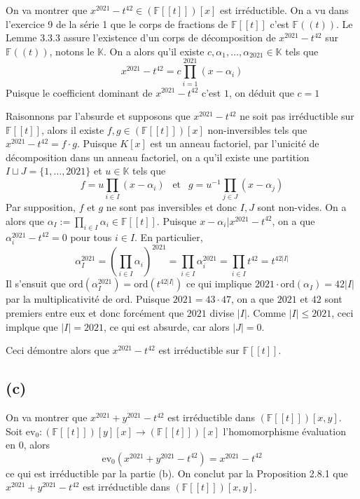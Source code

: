 \documentclass{article}
\newcommand{\F}{\mathbb{F}}
\newcommand{\K}{\mathbb{K}}
\newcommand{\sef}{\F[[t]]}
\newcommand{\sel}{\F((t))}
\newcommand{\ord}{\mathrm{ord}}
\newcommand{\ev}{\mathrm{ev}}
\begin{document}
On va montrer que $x^{2021} - t^{42} \in (\sef)[x]$ est
irréductible. On a vu dans l'exercice 9 de la série 1 que le
corps de fractions de $\sef$ c'est $\sel$.
Le Lemme $3.3.3$ assure l'existence d'un corps de décomposition de
$x^{2021} - t^{42}$ sur $\sel$, notons le $\K$. On a alors qu'il
existe $c, \alpha_1, \dots, \alpha_{2021} \in \K$ tels que
\begin{equation*}
	x^{2021} - t^{42} = c\prod_{i = 1}^{2021}(x - \alpha_i)
\end{equation*}
Puisque le coefficient dominant de $x^{2021} - t^{42}$ c'est $1$,
on déduit que $c = 1$

Raisonnons par l'absurde et supposons
que $x^{2021} - t^{42}$ ne soit pas
irréductible sur $\sef$, alors il existe $f, g \in (\sef)[x]$
non-inversibles tels que $x^{2021} - t^{42} = f\cdot g$.
Puisque $K[x]$ est un anneau factoriel, par
l'unicité de décomposition dans un anneau factoriel, on a qu'il
existe une partition $I \sqcup J = \{1, \dots, 2021\}$ et
$u \in \K$ tels que
\begin{equation*}
	f = u\prod_{i \in I} (x - \alpha_i)
	~~\text{ et }~~
	g = u^{-1}\prod_{j \in J} (x - \alpha_j)
\end{equation*}
Par supposition, $f$ et $g$ ne sont pas inversibles et donc $I, J$
sont non-vides.
On a alors que $\alpha_I := \prod_{i\in I}\alpha_i \in \sef$.
Puisque $x - \alpha_i|x^{2021} - t^{42}$, on a que 
$\alpha_i^{2021} - t^{42} = 0$ pour tous $i \in I$.
En particulier, 
\begin{equation*}
	\alpha_I^{2021} = \left(\prod_{i\in I}\alpha_i\right)^{2021}
	= \prod_{i\in I}\alpha_i^{2021}
	= \prod_{i \in I}t^{42} = t^{42|I|}
\end{equation*}
Il s'ensuit que $\ord(\alpha_I^{2021}) = \ord(t^{42|I|})$ ce qui
implique $2021\cdot\ord(\alpha_I) = 42|I|$ par la multiplicativité
de $\ord$. Puisque $2021 = 43\cdot47$, on a que $2021$ et $42$
sont premiers entre eux et donc forcément que
$2021$ divise $|I|$. Comme $|I| \leq 2021$, ceci implque que
$|I| = 2021$, ce qui est absurde, car alors $|J| = 0$.

Ceci démontre alors que $x^{2021} - t^{42}$ est irréductible
sur $\sef$.

\subsection*{(c)}

On va montrer que $x^{2021} + y^{2021} - t^{42}$ est irréductible
dans $(\sef)[x, y]$. Soit $\ev_0: (\sef)[y][x] \to (\sef)[x]$
l'homomorphisme évaluation en 0, alors
\begin{equation*}
	\ev_0(x^{2021} + y^{2021} - t^{42}) = x^{2021} - t^{42}
\end{equation*}
ce qui est irréductible par la partie (b). On conclut par la
Proposition 2.8.1 que $x^{2021} + y^{2021} - t^{42}$ est
irréductible dans $(\sef)[x, y]$.
\end{document}
